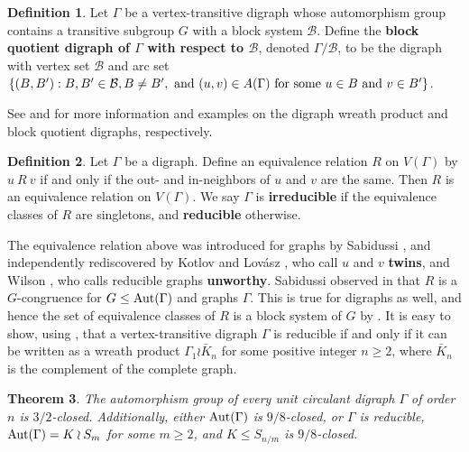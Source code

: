 \documentclass{amsart}
\newtheorem{thrm}{Theorem}[section]
\theoremstyle{definition}
\newtheorem{definition}[thrm]{Definition}
\theoremstyle{remark}
\numberwithin{equation}{section}
\def\Aut{{\rm Aut}}
\def\cal{\mathcal}
\begin{document}
\begin{definition}
Let $\Gamma$ be a vertex-transitive digraph whose automorphism group contains a transitive subgroup $G$ with a block system ${\cal B}$.  Define the {\bf block quotient digraph of $\Gamma$ with respect to ${\cal B}$}, denoted $\Gamma/{\cal B}$, to be the digraph with vertex set ${\cal B}$ and arc set $\{(B,B'):B,B'\in{\cal B}, B\neq B',{\rm\ and\ }(u,v)\in A(\Gamma){\rm\ for\ some\ }u\in B{\rm\ and\ } v \in B'\}$.
\end{definition}

See \cite[\S 4.2]{Book} and \cite[\S 2.6]{Book} for more information and examples on the digraph wreath product and block quotient digraphs, respectively.

\begin{definition}
Let $\Gamma$ be a digraph.  Define an equivalence relation $R$ on $V(\Gamma)$ by $u\ R\ v$ if and only if the out- and in-neighbors of $u$ and $v$ are the same.  Then $R$ is an equivalence relation on $V(\Gamma)$. We say $\Gamma$ is {\bf irreducible} if the equivalence classes of $R$ are singletons, and {\bf reducible} otherwise.
\end{definition}

{\color{purple}

The equivalence relation above was introduced for graphs by Sabidussi \cite[Definition 3]{Sabidussi1959}, and independently rediscovered by Kotlov and Lov\'asz \cite{KotlovL1996}, who call $u$ and $v$ {\bf twins}, and Wilson \cite{Wilson2003}, who calls reducible graphs {\bf unworthy}.  Sabidussi observed in \cite{Sabidussi1964} that $R$ is a $G$-congruence for $G\le\Aut(\Gamma)$ and graphs $\Gamma$.  This is true for digraphs as well, and hence the set of equivalence classes of $R$ is a block system of $G$ by \cite[Theorem 3.2.2]{Book}.  It is easy to show, using \cite[Theorem 4.2.15]{Book}, that a vertex-transitive digraph $\Gamma$ is reducible if and only if it can be written as a wreath product $\Gamma_1\wr\bar{K}_n$ for some positive integer $n\ge 2$, where $\bar{K}_n$ is the complement of the complete graph.

}

\begin{thrm}\label{unit circ auto}
The automorphism group of every unit circulant digraph $\Gamma$ of order $n$ is $3/2$-closed.  Additionally, either $\Aut(\Gamma)$ is $9/8$-closed, or $\Gamma$ is reducible, $\Aut(\Gamma) = K\wr S_m$ for some $m\ge 2$, and $K\le S_{n/m}$ is $9/8$-closed.
\end{thrm}
\end{document}
